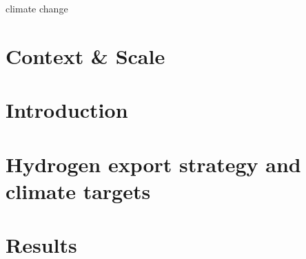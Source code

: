 \documentclass[5p,numafflabel]{elsarticle}
\begin{document}




climate change

\section*{Context \& Scale}





\section*{Introduction}
\label{sec:intro}



\section*{Hydrogen export strategy and climate targets}
\label{sec:policyandtargets}





\section*{Results}
\label{sec:results}
\end{document}
